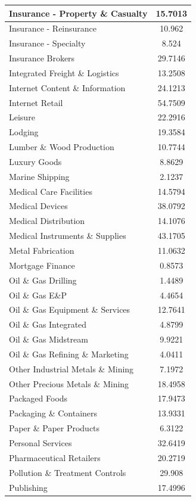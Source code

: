\documentclass{article}
\begin{document}
\begin{xtabular}{|l|c|}
Insurance - Property \& Casualty & 15.7013\\ \hline
Insurance - Reinsurance & 10.962\\ \hline
Insurance - Specialty & 8.524\\ \hline
Insurance Brokers & 29.7146\\ \hline
Integrated Freight \& Logistics & 13.2508\\ \hline
Internet Content \& Information & 24.1213\\ \hline
Internet Retail & 54.7509\\ \hline
Leisure & 22.2916\\ \hline
Lodging & 19.3584\\ \hline
Lumber \& Wood Production & 10.7744\\ \hline
Luxury Goods & 8.8629\\ \hline
Marine Shipping & 2.1237\\ \hline
Medical Care Facilities & 14.5794\\ \hline
Medical Devices & 38.0792\\ \hline
Medical Distribution & 14.1076\\ \hline
Medical Instruments \& Supplies & 43.1705\\ \hline
Metal Fabrication & 11.0632\\ \hline
Mortgage Finance & 0.8573\\ \hline
Oil \& Gas Drilling & 1.4489\\ \hline
Oil \& Gas E\&P & 4.4654\\ \hline
Oil \& Gas Equipment \& Services & 12.7641\\ \hline
Oil \& Gas Integrated & 4.8799\\ \hline
Oil \& Gas Midstream & 9.9221\\ \hline
Oil \& Gas Refining \& Marketing & 4.0411\\ \hline
Other Industrial Metals \& Mining & 7.1972\\ \hline
Other Precious Metals \& Mining & 18.4958\\ \hline
Packaged Foods & 17.9473\\ \hline
Packaging \& Containers & 13.9331\\ \hline
Paper \& Paper Products & 6.3122\\ \hline
Personal Services & 32.6419\\ \hline
Pharmaceutical Retailers & 20.2719\\ \hline
Pollution \& Treatment Controls & 29.908\\ \hline
Publishing & 17.4996\\ \hline

\end{xtabular}
\end{document}
